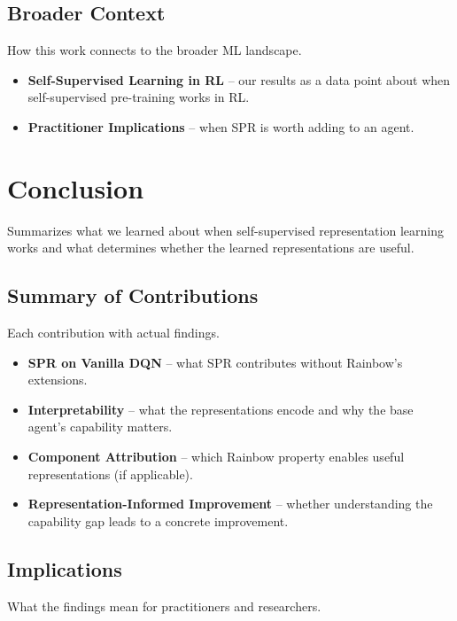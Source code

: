 \documentclass[11pt]{article}
\begin{document}
\subsection{Broader Context}

\noindent How this work connects to the broader ML landscape.

\begin{itemize}
\item \textbf{Self-Supervised Learning in RL} -- our results as a
  data point about when self-supervised pre-training works in RL.
\item \textbf{Practitioner Implications} -- when SPR is worth
  adding to an agent.
\end{itemize}

\section{Conclusion}

\noindent Summarizes what we learned about when self-supervised
representation learning works and what determines whether the
learned representations are useful.

\subsection{Summary of Contributions}

\noindent Each contribution with actual findings.

\begin{itemize}
\item \textbf{SPR on Vanilla DQN} -- what SPR contributes without
  Rainbow's extensions.
\item \textbf{Interpretability} -- what the representations encode
  and why the base agent's capability matters.
\item \textbf{Component Attribution} -- which Rainbow property
  enables useful representations (if applicable).
\item \textbf{Representation-Informed Improvement} -- whether
  understanding the capability gap leads to a concrete improvement.
\end{itemize}

\subsection{Implications}

\noindent What the findings mean for practitioners and researchers.
\end{document}
